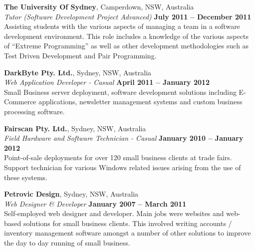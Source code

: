 \documentclass[margin,line]{resume}
\begin{document}
\begin{resume}
    \textbf{The University Of Sydney}, Camperdown, NSW, Australia \vspace{2mm}\\\vspace{1mm}%
    \textsl{Tutor (Software Development Project Advanced)} \hfill \textbf{July 2011 -- December 2011}\\
    Assisting students with the various aspects of managing a team in a software development environment.
    This role includes a knowledge of the various aspects of ``Extreme Programming'' as well as other development
    methodologies such as Test Driven Development and Pair Programming.

    \textbf{DarkByte Pty. Ltd.}, Sydney, NSW, Australia \vspace{2mm}\\\vspace{1mm}%
    \textsl{Web Application Developer - Casual} \hfill \textbf{April 2011 -- January 2012}\\
    Small Business server deployment, software development solutions including E-Commerce applications,
    newsletter management systems and custom business processing software.	

    \textbf{Fairscan Pty. Ltd.}, Sydney, NSW, Australia \vspace{2mm}\\\vspace{1mm}%
    \textsl{Field Hardware and Software Technician - Casual} \hfill \textbf{January 2010 -- January 2012}\\
    Point-of-sale deployments for over 120 small business clients at trade fairs. Support technician for various Windows
    related issues arising from the use of these systems.

    \textbf{Petrovic Design}, Sydney, NSW, Australia \vspace{2mm}\\\vspace{1mm}%
    \textsl{Web Designer \& Developer} \hfill \textbf{January 2007 -- March 2011}\\
    Self-employed web designer and developer. Main jobs were websites and web-based solutions for small business clients.
    This involved writing accounts / inventory management software amongst a number of other solutions to improve the day
    to day running of small business.
 

\end{resume}
\end{document}
